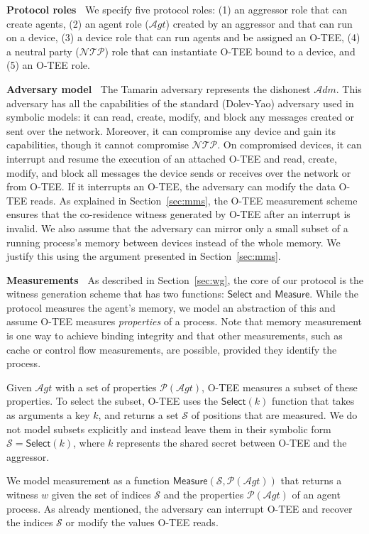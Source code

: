\documentclass[letterpaper,twocolumn,10pt]{article}
\newcommand{\N}{\ensuremath{\mathcal{N\!T}\mathcal{\!P}}\xspace}
\newcommand{\ADM}{\ensuremath{\mathcal{A}dm}\xspace}
\newcommand{\agent}{\ensuremath{\mathcal{A}gt}\xspace}
\newcommand{\mypara}[1]{\vspace{.5em}\noindent\textbf{{#1}~}}
\begin{document}
\label{sec:prot-model-tamar}
\mypara{Protocol roles}
We specify five protocol roles: (1) an aggressor role that can create agents, (2) an agent role (\agent)
created by an aggressor and that can run on a device, (3) a device role that can run agents and be
assigned an O-TEE, (4) a neutral party (\N) role that can instantiate O-TEE bound to a device,
and (5) an O-TEE role.

\mypara{Adversary model}
The Tamarin adversary represents the dishonest \ADM. This adversary has all the capabilities of the
standard (Dolev-Yao) adversary used in symbolic models: it can read, create, modify, and block any
messages created or sent over the network. Moreover, it can compromise any device and gain its capabilities,
though it cannot compromise \N. On compromised devices, it can interrupt and resume the execution of an
attached O-TEE and read, create, modify, and block all messages the device sends or receives over
the network or from O-TEE. If it interrupts an O-TEE, the adversary can modify the data O-TEE reads.
As explained in Section~\ref{sec:mms}, the O-TEE measurement scheme ensures that the co-residence
witness generated by O-TEE after an interrupt is invalid. We also assume that the adversary can
mirror only a small subset of a running process's memory between devices instead of the whole memory.
We justify this using the argument presented in Section~\ref{sec:mms}.

\mypara{Measurements} 
As described in Section~\ref{sec:wg}, the core of our protocol is the witness generation scheme that has
two functions: $\mathsf{Select}$ and $\mathsf{Measure}$. While the protocol measures the agent's memory,
we model an abstraction of this and assume O-TEE measures \emph{properties} of a process.
Note that memory measurement is one way to achieve binding integrity and that other measurements,
such as cache or control flow measurements, are possible, provided they identify the process.

Given $\agent$ with a set of properties $\mathcal{P}(\agent)$, O-TEE measures a subset of these properties.
To select the subset, O-TEE uses the $\mathsf{Select}(k)$ function that takes as arguments a key $k$,
and returns a set $\mathcal{S}$ of positions that are measured. We do not model subsets explicitly and
instead leave them in their symbolic form $\mathcal{S} = \mathsf{Select}(k)$, where
$k$ represents the shared secret between O-TEE and the aggressor.

We model measurement as a function $\mathsf{Measure}(\mathcal{S}, \mathcal{P}(\agent))$ that returns a
witness $w$ given the set of indices $\mathcal{S}$ and the properties $\mathcal{P}(\agent)$ of an agent process.
As already mentioned, the adversary can interrupt O-TEE and recover the indices $\mathcal{S}$ or
modify the values O-TEE reads.
\end{document}
